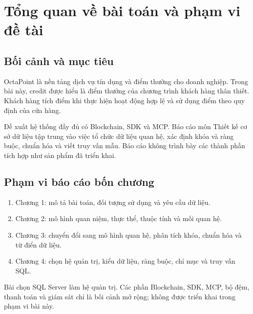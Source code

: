 \section{Tổng quan về bài toán và phạm vi đề tài}
\subsection{Bối cảnh và mục tiêu}
OctaPoint là nền tảng dịch vụ tín dụng và điểm thưởng cho doanh nghiệp. Trong bài này, credit được hiểu là điểm thưởng của chương trình khách hàng thân thiết. Khách hàng tích điểm khi thực hiện hoạt động hợp lệ và sử dụng điểm theo quy định của cửa hàng.

Đề xuất hệ thống đầy đủ có Blockchain, SDK và MCP. Báo cáo môn Thiết kế cơ sở dữ liệu tập trung vào việc tổ chức dữ liệu quan hệ, xác định khóa và ràng buộc, chuẩn hóa và viết truy vấn mẫu. Báo cáo không trình bày các thành phần tích hợp như sản phẩm đã triển khai.
\subsection{Phạm vi báo cáo bốn chương}
\begin{enumerate}
\item Chương 1: mô tả bài toán, đối tượng sử dụng và yêu cầu dữ liệu.
\item Chương 2: mô hình quan niệm, thực thể, thuộc tính và mối quan hệ.
\item Chương 3: chuyển đổi sang mô hình quan hệ, phân tích khóa, chuẩn hóa và từ điển dữ liệu.
\item Chương 4: chọn hệ quản trị, kiểu dữ liệu, ràng buộc, chỉ mục và truy vấn SQL.
\end{enumerate}
Bài chọn SQL Server làm hệ quản trị. Các phần Blockchain, SDK, MCP, bộ đệm, thanh toán và giám sát chỉ là bối cảnh mở rộng; không được triển khai trong phạm vi bài này.
